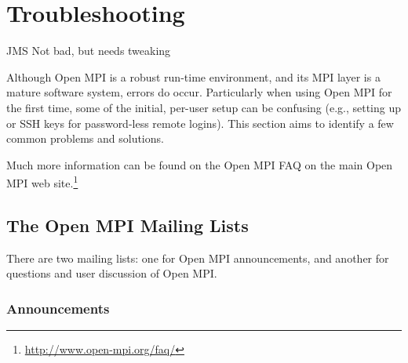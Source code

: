 %
% 
% 
%

\chapter{Troubleshooting}
\label{sec:troubleshooting}

{\Huge JMS Not bad, but needs tweaking}

Although Open MPI is a robust run-time environment, and its MPI layer
is a mature software system, errors do occur.  Particularly when using
Open MPI for the first time, some of the initial, per-user setup can
be confusing (e.g., setting up  or SSH keys for
password-less remote logins).  This section aims to identify a few
common problems and solutions.

Much more information can be found on the Open MPI FAQ on the main
Open MPI web site.\footnote{\url{http://www.open-mpi.org/faq/}}


\section{The Open MPI Mailing Lists}
\label{troubleshooting:mailing-lists}

There are two mailing lists: one for Open MPI announcements, and
another for questions and user discussion of Open MPI.


\subsection{Announcements}
  
